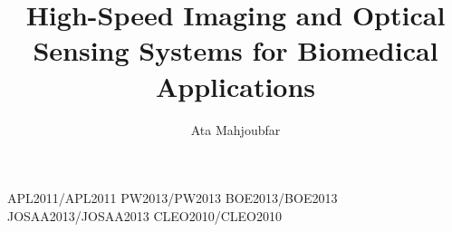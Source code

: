 \documentclass [PhD] {uclathes}
\title          {High-Speed Imaging and Optical Sensing Systems for Biomedical Applications}
\author         {Ata Mahjoubfar}
\begin{document}
\makeintropages

%
%
 {APL2011/APL2011}                         %
 {PW2013/PW2013}                         %
 {BOE2013/BOE2013}
 {JOSAA2013/JOSAA2013}
 {CLEO2010/CLEO2010}





\end{document}
